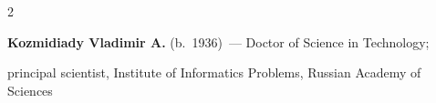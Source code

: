 \begin{multicols}{2}
\vspace*{3pt}





\noindent


\textbf{Kozmidiady Vladimir A.} (b.\ 1936)~--- Doctor of Science in Technology;


principal scientist, Institute of Informatics Problems,  Russian Academy of Sciences


\columnbreak






















































\end{multicols}

